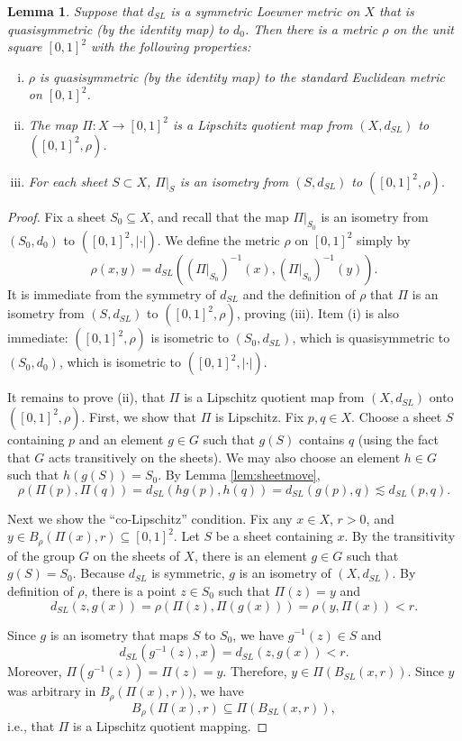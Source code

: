 \documentclass{amsart}
\theoremstyle{plain}
\newtheorem{lemma}[theorem]{Lemma}
\theoremstyle{definition}
\numberwithin{equation}{section}
\numberwithin{theorem}{section}
\begin{document}
\begin{lemma}\label{lem:sheetmetric}
Suppose that $d_{SL}$ is a symmetric Loewner metric on $X$ that is quasisymmetric (by the identity map) to $d_0$. Then there is a metric $\rho$ on the unit square $[0,1]^2$ with the following properties:

\begin{enumerate}[(i)]
\item $\rho$ is quasisymmetric (by the identity map) to the standard Euclidean metric on $[0,1]^2$.
\item The map $\Pi\colon X \rightarrow [0,1]^2$ is a Lipschitz quotient map from $(X,d_{SL})$ to $([0,1]^2,\rho)$.
\item For each sheet $S\subset X$, $\Pi|_S$ is an isometry from $(S,d_{SL})$ to $([0,1]^2,\rho)$.
\end{enumerate}
\end{lemma}
\begin{proof}
Fix a sheet $S_0\subseteq X$, and recall that the map $\Pi|_{S_0}$ is an isometry from $(S_0,d_0)$ to $([0,1]^2, |\cdot|)$. We define the metric $\rho$ on $[0,1]^2$ simply by
$$ \rho(x,y) = d_{SL}( (\Pi|_{S_0})^{-1}(x), (\Pi|_{S_0})^{-1}(y)).$$
It is immediate from the symmetry of $d_{SL}$ and the definition of $\rho$ that $\Pi$ is an isometry from $(S, d_{SL})$ to $([0,1]^2, \rho)$, proving (iii). Item (i) is also immediate: $([0,1]^2, \rho)$ is isometric to $(S_0,d_{SL})$, which is quasisymmetric to $(S_0,d_0)$, which is isometric to $([0,1]^2, |\cdot|)$.

It remains to prove (ii), that $\Pi$ is a Lipschitz quotient map from $(X,d_{SL})$ onto $([0,1]^2,\rho)$. First, we show that $\Pi$ is Lipschitz. Fix $p,q\in X$. Choose a sheet $S$ containing $p$ and an element $g\in G$ such that $g(S)$ contains $q$ (using the fact that $G$ acts transitively on the sheets). We may also choose an element $h\in G$ such that $h(g(S))=S_0$. By Lemma \ref{lem:sheetmove},
$$ \rho(\Pi(p),\Pi(q)) = d_{SL}(hg(p), h(q)) = d_{SL}(g(p),q) \lesssim d_{SL}(p, q).$$

Next we show the ``co-Lipschitz'' condition. Fix any $x\in X$, $r>0$, and $y\in B_\rho(\Pi(x), r) \subseteq [0,1]^2$. Let $S$ be a sheet containing $x$. By the transitivity of the group $G$ on the sheets of $X$, there is an element $g\in G$ such that $g(S) = S_0$. Because $d_{SL}$ is symmetric, $g$ is an isometry of $(X,d_{SL})$. By definition of $\rho$, there is a point $z\in S_0$ such that $\Pi(z)=y$ and
$$ d_{SL}(z,g(x)) = \rho(\Pi(z), \Pi(g(x)))=\rho(y,\Pi(x)) < r.$$

Since $g$ is an isometry that maps $S$ to $S_0$, we have $g^{-1}(z)\in S$ and 
$$ d_{SL}(g^{-1}(z), x) =  d_{SL}(z, g(x)) < r. $$
Moreover, $\Pi(g^{-1}(z)) = \Pi(z)=y$. Therefore, $y\in \Pi(B_{SL}(x,r))$. Since $y$ was arbitrary in $B_\rho(\Pi(x),r))$, we have
$$ B_\rho(\Pi(x),r) \subseteq \Pi(B_{SL}(x,r)),$$
i.e., that $\Pi$ is a Lipschitz quotient mapping.
\end{proof}
\end{document}
